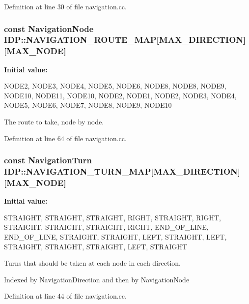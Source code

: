 Definition at line 30 of file navigation.cc.

\hypertarget{namespaceIDP_a33ba7fcc78e0c8e5477d2ed6ac18e48f}{
\subsubsection[{NAVIGATION\_\-ROUTE\_\-MAP}]{\setlength{\rightskip}{0pt plus 5cm}const {\bf NavigationNode} {\bf IDP::NAVIGATION\_\-ROUTE\_\-MAP}\mbox{[}MAX\_\-DIRECTION\mbox{]}\mbox{[}MAX\_\-NODE\mbox{]}}}
\label{namespaceIDP_a33ba7fcc78e0c8e5477d2ed6ac18e48f}
{\bfseries Initial value:}
\begin{DoxyCode}
 {
        {NODE2, NODE3, NODE4, NODE5, NODE6, NODE8, NODE8, NODE9, NODE10,
            NODE11, NODE10},
        {NODE2, NODE1, NODE2, NODE3, NODE4, NODE5, NODE6, NODE7, NODE8,
            NODE9, NODE10}
    }
\end{DoxyCode}


The route to take, node by node. 



Definition at line 64 of file navigation.cc.

\hypertarget{namespaceIDP_a0bada0608b684564e235786b3b38c10a}{
\subsubsection[{NAVIGATION\_\-TURN\_\-MAP}]{\setlength{\rightskip}{0pt plus 5cm}const {\bf NavigationTurn} {\bf IDP::NAVIGATION\_\-TURN\_\-MAP}\mbox{[}MAX\_\-DIRECTION\mbox{]}\mbox{[}MAX\_\-NODE\mbox{]}}}
\label{namespaceIDP_a0bada0608b684564e235786b3b38c10a}
{\bfseries Initial value:}
\begin{DoxyCode}
 {
        {STRAIGHT, STRAIGHT, STRAIGHT, RIGHT, STRAIGHT, RIGHT, STRAIGHT,
            STRAIGHT, STRAIGHT, RIGHT, END_OF_LINE},
        {END_OF_LINE, STRAIGHT, STRAIGHT, LEFT, STRAIGHT, LEFT, STRAIGHT,
            STRAIGHT, STRAIGHT, LEFT, STRAIGHT}
    }
\end{DoxyCode}


Turns that should be taken at each node in each direction. 

Indexed by NavigationDirection and then by NavigationNode 

Definition at line 44 of file navigation.cc.

